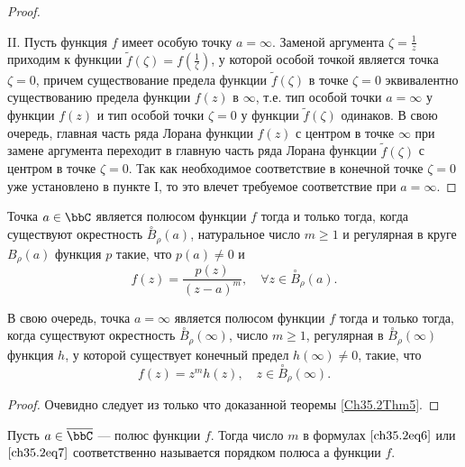 \begin{proof}
\begin{enumerate}
\end{enumerate}

II. Пусть функция $f$ имеет особую точку $a = \infty$. Заменой аргумента $\zeta = \frac{1}{z}$ приходим к функции $\widetilde{f}(\zeta) = f(\frac{1}{\zeta})$, у которой особой точкой является точка $\zeta = 0$, причем существование предела функции $\widetilde{f}(\zeta)$ в точке $\zeta = 0$ эквивалентно существованию предела функции $f(z)$ в $\infty$, т.е. тип особой точки $a = \infty$ у функции $f(z)$ и тип особой точки $\zeta = 0$ у функции $\widetilde{f}(\zeta)$ одинаков. В свою очередь, главная часть ряда Лорана функции $f(z)$ с центром в точке $\infty$ при замене аргумента переходит в главную часть ряда Лорана функции $\widetilde{f}(\zeta)$ с центром в точке $\zeta = 0$. Так как необходимое соответствие в конечной точке $\zeta = 0$ уже установлено в пункте I, то это влечет требуемое соответствие при $a  =\infty$.

\end{proof}

\begin{cons} \label{ch35.2cons1}
Точка $a \in \bbC$ является полюсом функции $f$ тогда и только тогда, когда существуют окрестность $\overset{\circ}{B}_\rho(a)$, натуральное число $m \ge 1$ и регулярная в круге $B_\rho(a)$ функция $p$ такие, что $p(a) \not = 0$ и
\begin{equation} \label{ch35.2eq6}
f(z) = \frac{p(z)}{(z - a)^m}, \quad \forall z \in \overset{\circ}{B}_\rho(a).
\end{equation}

В свою очередь, точка $a = \infty$ является полюсом функции $f$ тогда и только тогда, когда существуют окрестность $\overset{\circ}{B}_\rho(\infty)$, число $m \ge 1$, регулярная в $\overset{\circ}{B}_\rho(\infty)$ функция $h$, у которой существует конечный предел $h(\infty) \not= 0$, такие, что
\begin{equation} \label{ch35.2eq7}
f(z) = z^m h(z), \quad z \in \overset{\circ}{B}_\rho(\infty).
\end{equation}

\end{cons}

\begin{proof}
Очевидно следует из только что доказанной теоремы \ref{Ch35.2Thm5}.
\end{proof}

\begin{defn}
Пусть $a \in \overline{\bbC}$ --- полюс функции $f$. Тогда число $m$ в формулах $\eqref{ch35.2eq6}$ или $\eqref{ch35.2eq7}$ соответственно называется порядком полюса $а$ функции $f$.
\end{defn}

